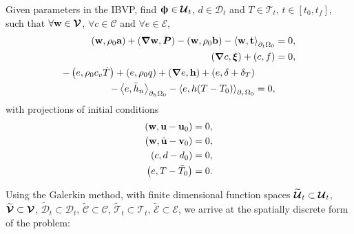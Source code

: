 \begin{mdframed}[
    frametitle={The weak form},
    frametitlebackgroundcolor=gray!20,
    backgroundcolor=gray!5,
    linewidth=0pt,
    nobreak=true
  ]
  Given parameters in the IBVP, find $\boldsymbol{\upphi} \in \boldsymbol{\mathcal{U}}_t$, $d \in \mathcal{D}_t$ and $T \in \mathcal{T}_t$, $t \in [t_0, t_f]$, such that $\forall \textbf{w} \in \boldsymbol{\mathcal{V}}$, $\forall c \in \mathcal{C}$ and $\forall e \in \mathcal{E}$,
  \begin{subequations}
    \begin{align}
      \left( \textbf{w}, \rho_0\textbf{a} \right) + \left( \boldsymbol{\nabla} \textbf{w}, \boldsymbol{P} \right) - \left( \textbf{w}, \rho_0 \textbf{b} \right) - \left< \textbf{w}, \textbf{t} \right>_{\partial_t\Omega_0} & = 0, \\
      \left( \boldsymbol{\nabla} c, \boldsymbol{\xi} \right) + \left( c, f \right)                                                                                               & = 0, \\
      \begin{split}
        - \left( e, \rho_0c_v\dot{T} \right) + \left( e, \rho_0q \right) + \left( \boldsymbol{\nabla} e, \textbf{h} \right) + \left( e, \delta+\delta_T \right)& \\
        - \left< e, \bar{h}_n \right>_{\partial_h\Omega_0} - \left< e, h(T-T_0) \right>_{\partial_r\Omega_0} &= 0,
      \end{split}
    \end{align}
  \end{subequations}
  with projections of initial conditions
  \begin{subequations}
    \begin{align}
      \left( \textbf{w}, \textbf{u} - \textbf{u}_0 \right)       & = 0, \\
      \left( \textbf{w}, \dot{\textbf{u}} - \textbf{v}_0 \right) & = 0, \\
      \left( c, d - d_0 \right)                & = 0, \\
      \left( e, T - \bar{T}_0 \right)          & = 0. 
    \end{align}
  \end{subequations}
\end{mdframed}
Using the Galerkin method, with finite dimensional function spaces $\widetilde{\boldsymbol{\mathcal{U}}}_t \subset \boldsymbol{\mathcal{U}}_t$, $\widetilde{\boldsymbol{\mathcal{V}}} \subset \boldsymbol{\mathcal{V}}$, $\widetilde{\mathcal{D}}_t \subset \mathcal{D}_t$, $\widetilde{\mathcal{C}} \subset \mathcal{C}$, $\widetilde{\mathcal{T}}_t \subset \mathcal{T}_t$, $\widetilde{\mathcal{E}} \subset \mathcal{E}$, we arrive at the spatially discrete form of the problem:
